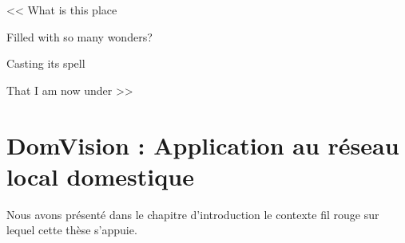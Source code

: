 \begin{savequote}[6cm]
<< What is this place

Filled with so many wonders?

Casting its spell

That I am now under >>

\end{savequote}

\chapter{DomVision : Application au réseau local domestique}
Nous avons présenté dans le chapitre d'introduction le contexte fil rouge sur lequel cette thèse s'appuie. 




